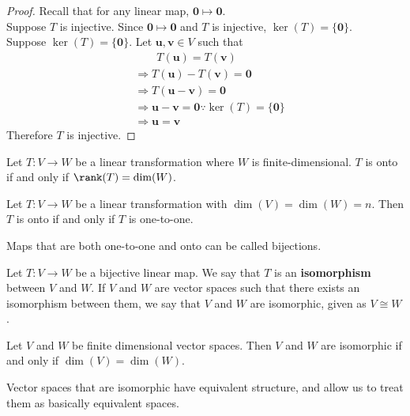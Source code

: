 \begin{proof}
    Recall that for any linear map, \(\mathbf{0}\mapsto \mathbf{0}  \).\\
    Suppose \(T\) is injective. Since \(\mathbf{0}\mapsto \mathbf{0}\) and \(T\) is injective, \(\ker (T)=\{ \mathbf{0} \} \).\\
    Suppose \(\ker (T)=\{ \mathbf{0}  \} \). Let \(\mathbf{u} ,\mathbf{v} \in V\) such that 
    \begin{align*}
        &\qquad T(\mathbf{u} )=T(\mathbf{v} )\\
        &\Longrightarrow T(\mathbf{u} )-T(\mathbf{v} )=\mathbf{0}\\
        &\Longrightarrow T(\mathbf{u} -\mathbf{v} )=\mathbf{0}\\
        &\Longrightarrow \mathbf{u} -\mathbf{v} =\mathbf{0} \because\ker(T)=\{ \mathbf{0}  \}\\
        &\Longrightarrow \mathbf{u} =\mathbf{v} 
    \end{align*}
    Therefore \(T\) is injective.
\end{proof}
\begin{theorem}
    Let \(T:V\to W\) be a linear transformation where \(W\) is finite-dimensional. \(T\) is onto if and only if \(\rank(T)=\dim (W)\).
\end{theorem}
\begin{theorem}
    Let \(T:V\to W\) be a linear transformation with \(\dim (V)=\dim (W)=n\). Then \(T\) is onto if and only if \(T\) is one-to-one.
\end{theorem}
Maps that are both one-to-one and onto can be called bijections.
\begin{definition}[Isomorphism]
    Let \(T:V\to W\) be a bijective linear map. We say that \(T\) is an \textbf{isomorphism} between \(V\) and \(W\). If \(V\) and \(W\) are vector spaces such that there exists an isomorphism between them, we say that \(V\) and \(W\) are isomorphic, given as \(V\cong W\).
\end{definition}
\begin{theorem}
    Let \(V\) and \(W\) be finite dimensional vector spaces. Then \(V\) and \(W\) are isomorphic if and only if \(\dim (V)=\dim (W)\).
\end{theorem}
Vector spaces that are isomorphic have equivalent structure, and allow us to treat them as basically equivalent spaces.
